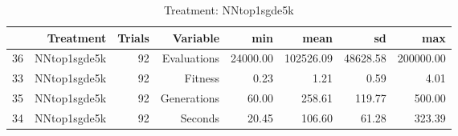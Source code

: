 \begin{table}[ht]
\centering
\begin{tabular}{rrrrrrrr}
  \hline
 & Treatment & Trials & Variable & min & mean & sd & max \\ 
  \hline
36 & NNtop1sgde5k &  92 & Evaluations & 24000.00 & 102526.09 & 48628.58 & 200000.00 \\ 
  33 & NNtop1sgde5k &  92 & Fitness & 0.23 & 1.21 & 0.59 & 4.01 \\ 
  35 & NNtop1sgde5k &  92 & Generations & 60.00 & 258.61 & 119.77 & 500.00 \\ 
  34 & NNtop1sgde5k &  92 & Seconds & 20.45 & 106.60 & 61.28 & 323.39 \\ 
   \hline
\end{tabular}
\caption{Treatment: NNtop1sgde5k} 
\end{table}
